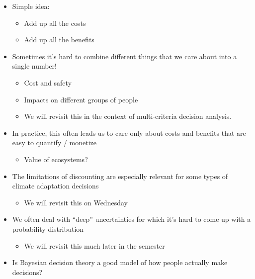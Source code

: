 \documentclass[
  letterpaper,
  DIV=11,
  numbers=noendperiod]{scrreprt}
\providecommand{\tightlist}{%
  \setlength{\itemsep}{0pt}\setlength{\parskip}{0pt}}
\begin{document}
\begin{itemize}
\tightlist
\item
  Simple idea:

  \begin{itemize}
  \tightlist
  \item
    Add up all the costs
  \item
    Add up all the benefits
  \end{itemize}
\item
  Sometimes it's hard to combine different things that we care about
  into a single number!

  \begin{itemize}
  \tightlist
  \item
    Cost and safety
  \item
    Impacts on different groups of people
  \item
    We will revisit this in the context of multi-criteria decision
    analysis.
  \end{itemize}
\item
  In practice, this often leads us to care only about costs and benefits
  that are easy to quantify / monetize

  \begin{itemize}
  \tightlist
  \item
    Value of ecosystems?
  \end{itemize}
\item
  The limitations of discounting are especially relevant for some types
  of climate adaptation decisions

  \begin{itemize}
  \tightlist
  \item
    We will revisit this on Wednesday
  \end{itemize}
\item
  We often deal with ``deep'' uncertainties for which it's hard to come
  up with a probability distribution

  \begin{itemize}
  \tightlist
  \item
    We will revisit this much later in the semester
  \end{itemize}
\item
  Is Bayesian decision theory a good model of how people actually make
  decisions?


\end{itemize}
\end{document}
